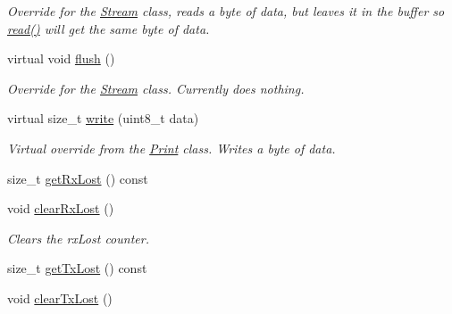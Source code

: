 \begin{DoxyCompactItemize}
\begin{DoxyCompactList}\small\item\em Override for the \mbox{\hyperlink{class_stream}{Stream}} class, reads a byte of data, but leaves it in the buffer so \mbox{\hyperlink{class_ble_serial_peripheral_base_a4933bc35d89028134597b46315806ce4}{read()}} will get the same byte of data. \end{DoxyCompactList}\item 
\mbox{\label{class_ble_serial_peripheral_base_a27e43dcfd3cb2edee33b19ba9017ad7f}} 
virtual void \mbox{\hyperlink{class_ble_serial_peripheral_base_a27e43dcfd3cb2edee33b19ba9017ad7f}{flush}} ()
\begin{DoxyCompactList}\small\item\em Override for the \mbox{\hyperlink{class_stream}{Stream}} class. Currently does nothing. \end{DoxyCompactList}\item 
virtual size\+\_\+t \mbox{\hyperlink{class_ble_serial_peripheral_base_ac041322685f26d921f60d01a2ed99e83}{write}} (uint8\+\_\+t data)
\begin{DoxyCompactList}\small\item\em Virtual override from the \mbox{\hyperlink{class_print}{Print}} class. Writes a byte of data. \end{DoxyCompactList}\item 
size\+\_\+t \mbox{\hyperlink{class_ble_serial_peripheral_base_a97cee829a39ff3a62e3108f05fba64d8}{get\+Rx\+Lost}} () const
\item 
\mbox{\label{class_ble_serial_peripheral_base_af2dc5ee170da6783176ce6c96456fdb4}} 
void \mbox{\hyperlink{class_ble_serial_peripheral_base_af2dc5ee170da6783176ce6c96456fdb4}{clear\+Rx\+Lost}} ()
\begin{DoxyCompactList}\small\item\em Clears the rx\+Lost counter. \end{DoxyCompactList}\item 
size\+\_\+t \mbox{\hyperlink{class_ble_serial_peripheral_base_a09c779ad7767bc195687c525548127d9}{get\+Tx\+Lost}} () const
\item 
\mbox{\label{class_ble_serial_peripheral_base_a3f7273afa5985d6df935b530d9550b6c}} 
void \mbox{\hyperlink{class_ble_serial_peripheral_base_a3f7273afa5985d6df935b530d9550b6c}{clear\+Tx\+Lost}} ()

\end{DoxyCompactItemize}
